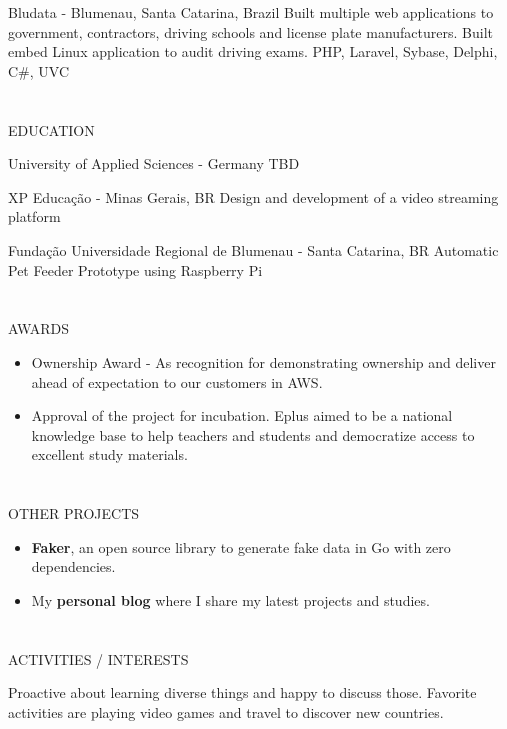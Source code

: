 \documentclass{my_cv}
\begin{document}
\begin{multicols}{2}
%
    {Bludata - Blumenau, Santa Catarina, Brazil}%
    {Built multiple web applications to government, contractors, driving schools and license plate manufacturers. Built embed Linux application to audit driving exams.}%
    {PHP, Laravel, Sybase, Delphi, C\#, UVC}%

\columnbreak

\section{\faGraduationCap}{EDUCATION}

{University of Applied Sciences - Germany} %
{TBD}

{XP Educação - Minas Gerais, BR} %
{Design and development of a video streaming platform}

{Fundação Universidade Regional de Blumenau - Santa Catarina, BR} %
{Automatic Pet Feeder Prototype using Raspberry Pi}

\section{\faStar}{AWARDS}

\begin{itemize}[noitemsep]
    \item Ownership Award - As recognition for demonstrating ownership and deliver ahead of expectation to our customers in AWS.
    \item Approval of the project for incubation. Eplus aimed to be a national knowledge base to help teachers and students and democratize access to excellent study materials.
\end{itemize}

\section{\faBookmark}{OTHER PROJECTS}
\begin{itemize}[noitemsep]
    \item \textbf{Faker}, an open source library to generate fake data in Go with zero dependencies.
    \item My \textbf{personal blog} where I share my latest projects and studies.
\end{itemize}

\section{\faCoffee}{ACTIVITIES / INTERESTS}

Proactive about learning diverse things and happy to discuss those. Favorite activities are playing video games and travel to discover new countries.


\end{multicols}
\end{document}

